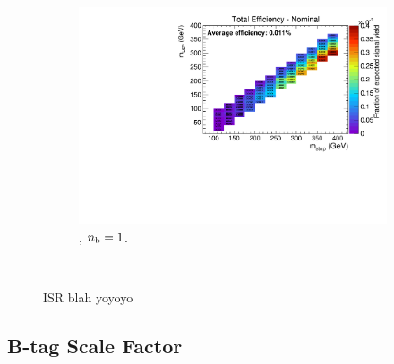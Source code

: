 \begin{figure}[ht!]
\begin{subfigure}[b]{0.32\textwidth}
    \includegraphics[width=\textwidth, page=6]{Figs/sms/t2degen/v5/ISR_T2_4body_v5_eq1b_ge4j_incl.pdf}
    \caption{\njhigh, $n_{\text{b}} = 1$.}
  \end{subfigure}\\
  \caption{ISR blah yoyoyo}
  \label{fig:sms-isr-t2degen}
\end{figure}


\newpage
\subsection*{B-tag Scale Factor}
\label{sec:t2degen_btag_plots}

